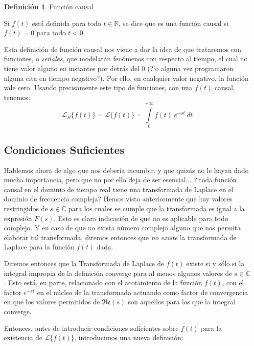 \documentclass[12pt]{article}
\theoremstyle{definition}
\newtheorem{definition}{Definici\'on}[section]
\theoremstyle{theorem}
\theoremstyle{corolary}
\theoremstyle{method}
\begin{document}
\colorbox{yellow!40!white!80}{\parbox{\linewidth}{
\theoremstyle{definition}
\begin{definition}{Funci\'on causal}

Si $f(t)$ est\'a definida para todo $t\in \mathbb{R}$, se dice que es una funci\'on causal si $f(t)=0$ para todo $t<0$.
\end{definition}}}
\linebreak
\linebreak

Esta definici\'on de funci\'on causal nos viene a dar la idea de que trataremos con funciones, o \textit{se\~nales}, que modelar\'an fen\'omenos con respecto al tiempo, el cual no tiene valor alguno en instantes por detr\'as del 0 (?`o alguna vez programaron alguna cita en tiempo negativo?). Por ello, en cualquier valor negativo, la funci\'on vale cero. Usando precisamente este tipo de funciones, con una $f(t)$ causal, tenemos: $$\mathscr{L}_B\{f(t)\} = \mathscr{L}\{f(t)\} = \int\limits_{0}^{+\infty}f(t)\ e^{-st}\ dt $$

\subsection*{Condiciones Suficientes}

Hablemos ahora de algo que nos deber\'ia incumbir, y que quiz\'as no le hayan dado mucha importancia, pero que no por ello deja de ser esencial... ?`toda funci\'on causal en el dominio de tiempo real tiene una transformada de Laplace en el dominio de frecuencia compleja? Hemos visto anteriormente que hay valores restringidos de $s\in \mathbb{C}$ para los cuales se cumple que la transformada es igual a la expresi\'on $F(s)$. Esto es clara indicaci\'on de que no es aplicable para todo complejo. Y en caso de que no exista n\'umero complejo alguno que nos permita elaborar tal transformada, diremos entonces que \textit{no existe} la transformada de Laplace para la funci\'on $f(t)$ dada.

Diremos entonces que la Transformada de Laplace de $f(t)$ existe si y s\'olo si la integral impropia de la definici\'on converge para al menos algunos valores de $s\in \mathbb{C}$. Esto est\'a, en parte, relacionado con el acotamiento de la funci\'on $f(t)$, con el factor $e^{-st}$ en el n\'ucleo de la transformada actuando como factor de convergencia en que los valores permitidos de $\mathfrak{Re}(s)$ son aquellos para los que la integral converge.

Entonces, antes de introducir condiciones suficientes sobre $f(t)$ para la existencia de $\mathscr{L}\{f(t)\}$, introducimos una nueva definici\'on:
\end{document}
